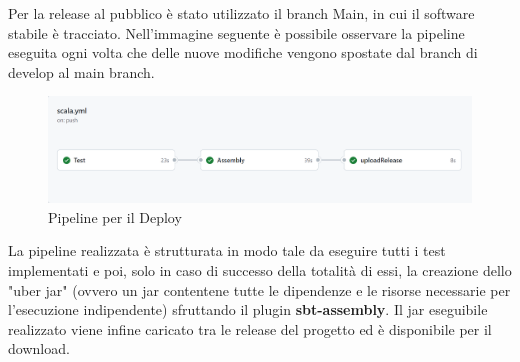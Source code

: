         Per la release al pubblico è stato utilizzato il branch Main, in cui il software stabile è tracciato. Nell'immagine seguente è possibile osservare la pipeline eseguita ogni volta che delle nuove modifiche vengono spostate dal branch di develop al main branch.
        \begin{figure}[H]
            \caption{Pipeline per il Deploy}
            \label{fig:CI-Test-Deploy}
            \centering
            \includegraphics[width=1\textwidth]{Images/CI-Test-Deploy.png}
        \end{figure}
        La pipeline realizzata è strutturata in modo tale da eseguire tutti i test implementati e poi, solo in caso di successo della totalità di essi, la creazione dello "uber jar" (ovvero un jar contentene tutte le dipendenze e le risorse necessarie per l'esecuzione indipendente) sfruttando il plugin \textbf{sbt-assembly}. Il jar eseguibile realizzato viene infine caricato tra le release del progetto ed è disponibile per il download.
    
